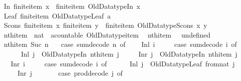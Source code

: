 \begin{isabellebody}
{\isacharbar}\ In{}{\isacharcolon}\ {\isachardoublequoteopen}finite{\isacharunderscore}item\ x\ {\isasymLongrightarrow}\ finite{\isacharunderscore}item\ {\isacharparenleft}Old{\isacharunderscore}Datatype{\isachardot}In{}\ x{\isacharparenright}{\isachardoublequoteclose}\isanewline
{\isacharbar}\ Leaf{\isacharcolon}\ {\isachardoublequoteopen}finite{\isacharunderscore}item\ {\isacharparenleft}Old{\isacharunderscore}Datatype{\isachardot}Leaf\ a{\isacharparenright}{\isachardoublequoteclose}\isanewline
{\isacharbar}\ Scons{\isacharcolon}\ {\isachardoublequoteopen}{\isasymlbrakk}finite{\isacharunderscore}item\ x{\isacharsemicolon}\ finite{\isacharunderscore}item\ y{\isasymrbrakk}\ {\isasymLongrightarrow}\ finite{\isacharunderscore}item\ {\isacharparenleft}Old{\isacharunderscore}Datatype{\isachardot}Scons\ x\ y{\isacharparenright}{\isachardoublequoteclose}\isanewline
\isanewline
{}\ \isamarkupfalse%
\ nth{\isacharunderscore}item\ {\isacharcolon}{\isacharcolon}\ {\isachardoublequoteopen}nat\ {\isasymRightarrow}\ {\isacharparenleft}{\isacharprime}a{\isacharcolon}{\isacharcolon}countable{\isacharparenright}\ Old{\isacharunderscore}Datatype{\isachardot}item{\isachardoublequoteclose}\isanewline
{}\isanewline
\ \ {\isachardoublequoteopen}nth{\isacharunderscore}item\ {}\ {\isacharequal}\ undefined{\isachardoublequoteclose}\isanewline
{\isacharbar}\ {\isachardoublequoteopen}nth{\isacharunderscore}item\ {\isacharparenleft}Suc\ n{\isacharparenright}\ {\isacharequal}\isanewline
\ \ {\isacharparenleft}case\ sum{\isacharunderscore}decode\ n\ of\isanewline
\ \ \ \ Inl\ i\ {\isasymRightarrow}\isanewline
\ \ \ \ {\isacharparenleft}case\ sum{\isacharunderscore}decode\ i\ of\isanewline
\ \ \ \ \ \ Inl\ j\ {\isasymRightarrow}\ Old{\isacharunderscore}Datatype{\isachardot}In{}\ {\isacharparenleft}nth{\isacharunderscore}item\ j{\isacharparenright}\isanewline
\ \ \ \ {\isacharbar}\ Inr\ j\ {\isasymRightarrow}\ Old{\isacharunderscore}Datatype{\isachardot}In{}\ {\isacharparenleft}nth{\isacharunderscore}item\ j{\isacharparenright}{\isacharparenright}\isanewline
\ \ {\isacharbar}\ Inr\ i\ {\isasymRightarrow}\isanewline
\ \ \ \ {\isacharparenleft}case\ sum{\isacharunderscore}decode\ i\ of\isanewline
\ \ \ \ \ \ Inl\ j\ {\isasymRightarrow}\ Old{\isacharunderscore}Datatype{\isachardot}Leaf\ {\isacharparenleft}from{\isacharunderscore}nat\ j{\isacharparenright}\isanewline
\ \ \ \ {\isacharbar}\ Inr\ j\ {\isasymRightarrow}\isanewline
\ \ \ \ \ \ {\isacharparenleft}case\ prod{\isacharunderscore}decode\ j\ of\isanewline

\end{isabellebody}

